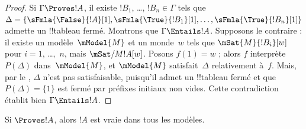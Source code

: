 \documentclass[../../../include/open-logic-section]{subfiles}
\begin{document}
\begin{proof}
  Si $\Gamma \Proves !A$, il existe $!B_1$, \dots, $!B_n \in
  \Gamma$ tels que
  $\Delta = \{\sFmla{\False}{!A}[1], \sFmla{\True}{!B_1}[1],
  \dots, \sFmla{\True}{!B_n}[1]\}$ admette un !!{tableau} fermé.
  Montrons que $\Gamma \Entails !A$. Supposons le contraire : il
  existe un modèle~$\mModel{M}$ et un monde~$w$ tels que
  $\mSat{M}{!B_i}[w]$ pour $i=1$, \dots,~$n$, mais
  $\mSat/{M}{!A}[w]$. Posons $f(1)=w$ ; alors $f$ interprète
  $P(\Delta)$ dans~$\mModel{M}$, et $\mModel{M}$ satisfait~$\Delta$
  relativement à~$f$. Mais, par le
  , $\Delta$ n'est pas satisfaisable,
  puisqu'il admet un !!{tableau} fermé et que $P(\Delta)=\{1\}$ est
  fermé par préfixes initiaux non vides. Cette contradiction établit
  bien $\Gamma \Entails !A$.
\end{proof}

\begin{cor}
Si $\Proves !A$, alors $!A$ est vraie dans tous les modèles.
\end{cor}
\end{document}
